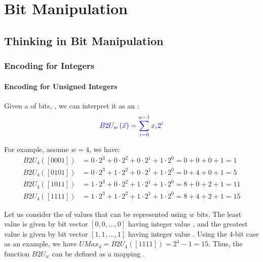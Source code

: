 \chapter{Bit Manipulation}\label{ch:bit_manipulation}
\section{Thinking in Bit Manipulation}
\subsection{Encoding for Integers}
\subsubsection{Encoding for Unsigned Integers}
Given a {\color{blue}{bit vector}} of {\color{blue}{$w$}} bits, {}, we can interpret it as an {\color{blue}{unsigned integer}}:
\begin{equation}
{\color{blue}{B2U_w\left(\vec{x}\right) = \sum_{i=0}^{w-1}x_i2^i}}
\end{equation}

For example, assume $w = 4$, we have:
\begin{align*}
B2U_4([0001]) &= 0 \cdot 2^3 + 0 \cdot 2^2 + 0 \cdot 2^1 + 1 \cdot 2^0 = 0 + 0 + 0 + 1 = 1 \\
B2U_4([0101]) &= 0 \cdot 2^3 + 1 \cdot 2^2 + 0 \cdot 2^1 + 1 \cdot 2^0 = 0 + 4 + 0 + 1 = 5 \\
B2U_4([1011]) &= 1 \cdot 2^3 + 0 \cdot 2^2 + 1 \cdot 2^1 + 1 \cdot 2^0 = 8 + 0 + 2 + 1 = 11 \\
B2U_4([1111]) &= 1 \cdot 2^3 + 1 \cdot 2^2 + 1 \cdot 2^1 + 1 \cdot 2^0 = 8 + 4 + 2 + 1 = 15
\end{align*}\mbox{}

Let us consider the {\color{blue}{range}} of values that can be represented using $w$ bits. The least value is given by bit vector $\left[0, 0, \dots, 0\right]$ having integer value {\color{blue}{$UMin_w = 0$}}, and the greatest value is given by bit vector $\left[1, 1, \dots, 1\right]$ having integer value {}. Using the $4$-bit case as an example, we have $UMax_4 = B2U_4([1111]) = 2^4 - 1= 15$. Thus, the function $B2U_w$ can be deﬁned as a mapping {}.\\

